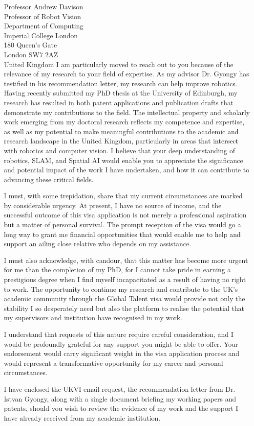 \documentclass[12pt,a4paper]{letter}
\begin{document}
\begin{letter}{Professor Andrew Davison\\Professor of Robot Vision\\Department of Computing\\Imperial College London\\180 Queen's Gate\\London SW7 2AZ\\United Kingdom}
I am particularly moved to reach out to you because of the relevance of my research to your field of expertise. As my advisor Dr. Gyongy has testified in his recommendation letter, my research can help improve robotics. Having recently submitted my PhD thesis at the University of Edinburgh, my research has resulted in both patent applications and publication drafts that demonstrate my contributions to the field. The intellectual property and scholarly work emerging from my doctoral research reflects my competence and expertise, as well as my potential to make meaningful contributions to the academic and research landscape in the United Kingdom, particularly in areas that intersect with robotics and computer vision. I believe that your deep understanding of robotics, SLAM, and Spatial AI would enable you to appreciate the significance and potential impact of the work I have undertaken, and how it can contribute to advancing these critical fields.

I must, with some trepidation, share that my current circumstances are marked by considerable urgency. At present, I have no source of income, and the successful outcome of this visa application is not merely a professional aspiration but a matter of personal survival. The prompt reception of the visa would go a long way to grant me financial opportunities that would enable me to help and support an ailing close relative who depends on my assistance. 

I must also acknowledge, with candour, that this matter has become more urgent for me than the completion of my PhD, for I cannot take pride in earning a prestigious degree when I find myself incapacitated as a result of having no right to work. The opportunity to continue my research and contribute to the UK's academic community through the Global Talent visa would provide not only the stability I so desperately need but also the platform to realise the potential that my supervisors and institution have recognised in my work.

I understand that requests of this nature require careful consideration, and I would be profoundly grateful for any support you might be able to offer. Your endorsement would carry significant weight in the visa application process and would represent a transformative opportunity for my career and personal circumstances.

I have enclosed the UKVI email request, the recommendation letter from Dr. Istvan Gyongy, along with a single document briefing my working papers and patents, should you wish to review the evidence of my work and the support I have already received from my academic institution.


\end{letter}
\end{document}
